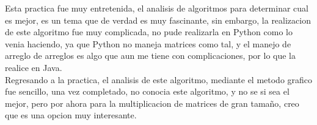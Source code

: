\documentclass[spanish]{article}
\begin{document}
	\bigskip
Esta practica fue muy entretenida, el analisis de algoritmos para determinar cual es mejor, es un tema que de verdad es muy fascinante, sin embargo, la realizacion de este algoritmo fue muy complicada, no pude realizarla en Python como lo venia haciendo, ya que Python no maneja matrices como tal, y el manejo de arreglo de arreglos es algo que aun me tiene con complicaciones, por lo que la realice en Java.\\
Regresando a la practica, el analisis de este algoritmo, mediante el metodo grafico fue sencillo, una vez completado, no conocia este algoritmo, y no se si sea el mejor, pero por ahora para la multiplicacion de matrices de gran tamaño, creo que es una opcion muy interesante.
	\bigskip
\end{document}
